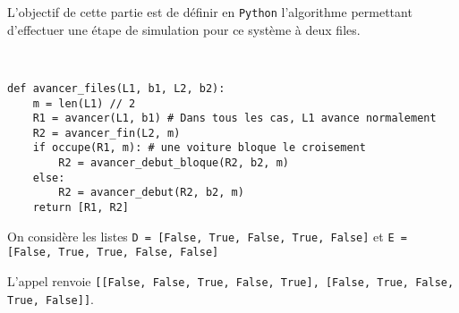 \ifprof
\else
L'objectif de cette partie est de définir en \lstinline{Python} l'algorithme permettant d'effectuer une étape
de simulation pour ce système à deux files.
\fi


\ifprof
\begin{corrige}~\\ \vspace{-.5cm}
\begin{lstlisting}
def avancer_files(L1, b1, L2, b2):
    m = len(L1) // 2
    R1 = avancer(L1, b1) # Dans tous les cas, L1 avance normalement
    R2 = avancer_fin(L2, m)
    if occupe(R1, m): # une voiture bloque le croisement
        R2 = avancer_debut_bloque(R2, b2, m)
    else:
        R2 = avancer_debut(R2, b2, m)
    return [R1, R2]
\end{lstlisting}
\end{corrige}
\else
\fi


\ifprof
\else
On considère les listes \lstinline{D = [False, True, False, True, False]} et \lstinline{E = [False, True, True, False, False]}
\fi


\ifprof
\begin{corrige}
 L'appel renvoie \lstinline{[[False, False, True, False, True], [False, True, False, True, False]]}.
\end{corrige}
\else
\fi

